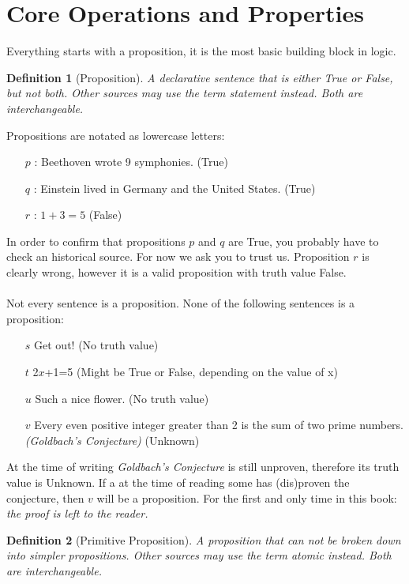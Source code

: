 \documentclass[10pt,a4paper,draft,titlepage,onecolumn]{book}
\newtheorem{definition}{Definition}[section]
\begin{document}
\section{Core Operations and Properties}
Everything starts with a proposition, it is the most basic building block in logic.
\begin{definition}[Proposition]
A declarative sentence that is either True or False, but not both. Other sources may use the term \textit{statement} instead. Both are interchangeable. 
\end{definition}
Propositions are notated as lowercase letters:
\begin{itemize}
 \item[$p$]: Beethoven wrote 9 symphonies. (True)
 \item[$q$]: Einstein lived in Germany and the United States. (True)
 \item[$r$]: $ 1 + 3 = 5 $ (False)
\end{itemize}
In order to confirm that propositions $p$ and $q$ are True, you probably have to check an historical source. For now we ask you to trust us. 
Proposition $r$ is clearly wrong, however it is a valid proposition with truth value False. \\ \\
Not every sentence is a proposition. None of the following sentences is a proposition:
\begin{itemize}
 \item[$s$]  Get out! (No truth value)
 \item[$t$]  2{$x$}+1=5 (Might be True or False, depending on the value of x)
 \item[$u$]  Such a nice flower. (No truth value)
 \item[$v$]  Every even positive integer greater than 2 is the sum of two prime numbers. \textit{(Goldbach’s Conjecture)} (Unknown)
\end{itemize}
At the time of writing \textit{Goldbach's Conjecture} is still unproven, therefore its truth value is Unknown. If a at the time of reading some has (dis)proven the conjecture, then $v$ will be a proposition. For the first and only time in this book: \textit{the proof is left to the reader.}

\begin{definition}[Primitive Proposition]
A proposition that can not be broken down into simpler propositions. Other sources may use the term \textit{atomic} instead. Both are interchangeable. 
\end{definition}
\end{document}
